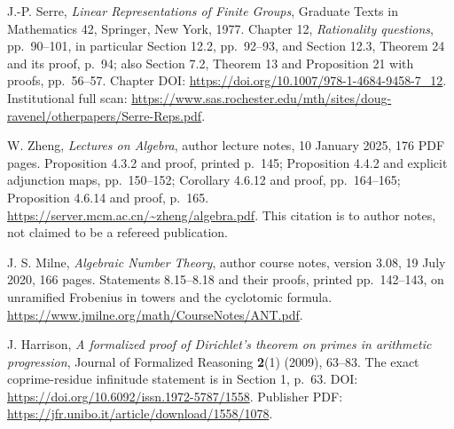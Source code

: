 J.-P. Serre, \emph{Linear Representations of Finite Groups},
Graduate Texts in Mathematics 42, Springer, New York, 1977.
Chapter 12, \emph{Rationality questions}, pp.~90--101,
in particular Section 12.2, pp.~92--93, and Section 12.3,
Theorem 24 and its proof, p.~94; also Section 7.2,
Theorem 13 and Proposition 21 with proofs, pp.~56--57.
Chapter DOI: \url{https://doi.org/10.1007/978-1-4684-9458-7_12}.
Institutional full scan:
\url{https://www.sas.rochester.edu/mth/sites/doug-ravenel/otherpapers/Serre-Reps.pdf}.

W. Zheng, \emph{Lectures on Algebra}, author lecture notes,
10 January 2025, 176 PDF pages.
Proposition 4.3.2 and proof, printed p.~145;
Proposition 4.4.2 and explicit adjunction maps, pp.~150--152;
Corollary 4.6.12 and proof, pp.~164--165;
Proposition 4.6.14 and proof, p.~165.
\url{https://server.mcm.ac.cn/~zheng/algebra.pdf}.
This citation is to author notes, not claimed to be a refereed publication.

J. S. Milne, \emph{Algebraic Number Theory},
author course notes, version 3.08, 19 July 2020, 166 pages.
Statements 8.15--8.18 and their proofs,
printed pp.~142--143, on unramified Frobenius in towers and
the cyclotomic formula.
\url{https://www.jmilne.org/math/CourseNotes/ANT.pdf}.

J. Harrison, \emph{A formalized proof of Dirichlet's theorem
on primes in arithmetic progression},
Journal of Formalized Reasoning \textbf{2}(1) (2009), 63--83.
The exact coprime-residue infinitude statement is in
Section 1, p.~63.
DOI: \url{https://doi.org/10.6092/issn.1972-5787/1558}.
Publisher PDF: \url{https://jfr.unibo.it/article/download/1558/1078}.
